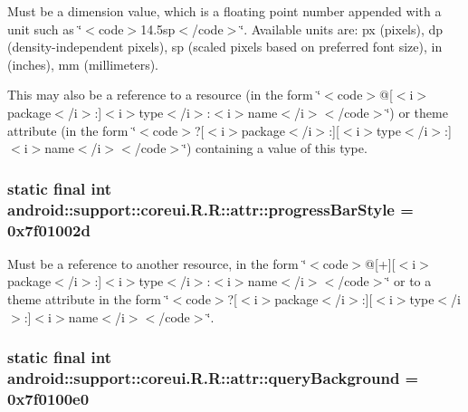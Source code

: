 Must be a dimension value, which is a floating point number appended with a unit such as \char`\"{}$<$code$>$14.5sp$<$/code$>$\char`\"{}. Available units are: px (pixels), dp (density-independent pixels), sp (scaled pixels based on preferred font size), in (inches), mm (millimeters). 

This may also be a reference to a resource (in the form \char`\"{}$<$code$>$@\mbox{[}$<$i$>$package$<$/i$>$:\mbox{]}$<$i$>$type$<$/i$>$:$<$i$>$name$<$/i$>$$<$/code$>$\char`\"{}) or theme attribute (in the form \char`\"{}$<$code$>$?\mbox{[}$<$i$>$package$<$/i$>$:\mbox{]}\mbox{[}$<$i$>$type$<$/i$>$:\mbox{]}$<$i$>$name$<$/i$>$$<$/code$>$\char`\"{}) containing a value of this type. \hypertarget{classandroid_1_1support_1_1coreui_1_1_r_1_1attr_58687d5c148a5b7962c713b43345c867}{
\subsubsection[{progressBarStyle}]{\setlength{\rightskip}{0pt plus 5cm}static final int android::support::coreui.R.R::attr::progressBarStyle = 0x7f01002d}}
\label{classandroid_1_1support_1_1coreui_1_1_r_1_1attr_58687d5c148a5b7962c713b43345c867}


Must be a reference to another resource, in the form \char`\"{}$<$code$>$@\mbox{[}+\mbox{]}\mbox{[}$<$i$>$package$<$/i$>$:\mbox{]}$<$i$>$type$<$/i$>$:$<$i$>$name$<$/i$>$$<$/code$>$\char`\"{} or to a theme attribute in the form \char`\"{}$<$code$>$?\mbox{[}$<$i$>$package$<$/i$>$:\mbox{]}\mbox{[}$<$i$>$type$<$/i$>$:\mbox{]}$<$i$>$name$<$/i$>$$<$/code$>$\char`\"{}. \hypertarget{classandroid_1_1support_1_1coreui_1_1_r_1_1attr_9ff2fd2e0b0d08092644ff3951e81ad1}{
\subsubsection[{queryBackground}]{\setlength{\rightskip}{0pt plus 5cm}static final int android::support::coreui.R.R::attr::queryBackground = 0x7f0100e0}}
\label{classandroid_1_1support_1_1coreui_1_1_r_1_1attr_9ff2fd2e0b0d08092644ff3951e81ad1}


